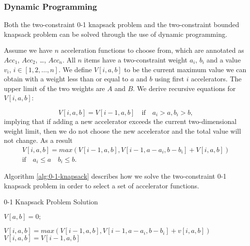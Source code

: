 \subsubsection{Dynamic Programming}

Both the two-constraint 0-1 knapsack problem and the two-constraint bounded knapsack problem can be solved
through the use of dynamic programming. 


Assume we have $n$ acceleration functions to choose from, which are
annotated as $Acc_1$, $Acc_2$, \ldots, $Acc_n$. All $n$ items have
a two-constraint weight $a_i$, $b_i$ and a value $v_i$, $i \in [1,
  2, \ldots, n]$. We define $V[i, a, b]$ to be the current
maximum value we can obtain with a weight less than or equal to $a$
and $b$ using first $i$ accelerators. The upper limit of the two weights
are $A$ and $B$. We derive recursive equations for $V[i, a, b]$:

\begin{equation}
V[i, a, b] = V[i-1, a, b] \quad \text{if} \quad a_i > a, b_i > b,
\end{equation}
implying that if adding a new accelerator exceeds the current
two-dimensional weight limit, then we do not choose the new
accelerator and the total value will not change. As a result
\begin{equation}
\begin{array}{c}
	V[i, a, b] = max(V[i-1, a, b], V[i-1, a - a_i, b - b_i] + V[i, a, b])\\
	\text{if} \quad a_i \leq a \quad b_i \leq b.
\end{array}
\end{equation}

Algorithm \ref{alg:0-1-knapsack} describes how we solve the two-constraint 0-1
knapsack problem in order to select a set of accelerator functions. 

\begin{algorithm}[htb]
\scriptsize
\caption{ 0-1 Knapsack Problem Solution}
\label{alg:0-1-knapsack}
\begin{algorithmic}[1] 
    	\STATE $ V[a, b] = 0; $
    \ENDFOR
\ENDFOR
{} 
    	
            	\STATE $V[i, a, b] = max(V[i-1, a, b], V[i-1, a - a_i, b - b_i] + v[i, a, b]) $
        	\ELSE
            	\STATE $V[i, a, b] = V[i-1, a, b]$
        	\ENDIF
        \ENDFOR
    \ENDFOR
\ENDFOR
\end{algorithmic}
\end{algorithm}

